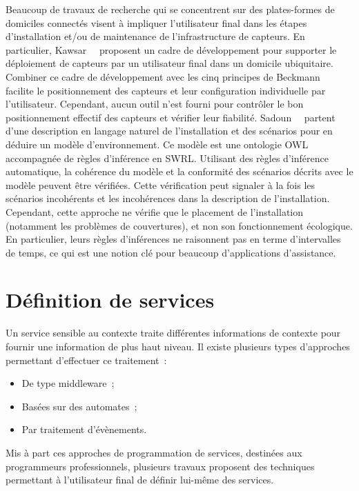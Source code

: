 Beaucoup de travaux de recherche qui se concentrent sur des plates-formes de 
domiciles connectés visent à impliquer l'utilisateur final dans les étapes 
d'installation et/ou de maintenance de l'infrastructure de capteurs.
En particulier, Kawsar~\etal~\parencite{kawsar2088deploy} proposent un cadre de 
développement pour supporter le déploiement de capteurs par un utilisateur final 
dans un domicile ubiquitaire. Combiner ce cadre de développement avec les cinq 
principes de Beckmann~\etal~\parencite{beckmann2004some} facilite le positionnement des 
capteurs et leur configuration individuelle par l'utilisateur. Cependant, aucun 
outil n'est fourni pour contrôler le bon positionnement effectif des capteurs 
et vérifier leur fiabilité.
Sadoun~\etal~\parencite{sadoun2011ontology} partent d'une description en langage naturel de 
l'installation et des scénarios pour en déduire un modèle d'environnement. Ce 
modèle est une ontologie OWL accompagnée de règles d'inférence en SWRL. 
Utilisant des règles d'inférence automatique, la cohérence du modèle et la 
conformité des scénarios décrits avec le modèle peuvent être vérifiées. Cette 
vérification peut signaler à la fois les scénarios incohérents et les 
incohérences dans la description de l'installation. Cependant, cette approche ne 
vérifie que le placement de l'installation (notamment les problèmes de couvertures), 
et non son fonctionnement écologique.
En particulier, leurs règles d'inférences ne raisonnent pas en terme d'intervalles de temps, 
ce qui est une notion clé pour beaucoup d'applications d'assistance.

\section{Définition de services}
Un service sensible au contexte traite différentes informations de contexte pour fournir une information de plus haut niveau. Il existe plusieurs types d'approches permettant d'effectuer ce traitement~:
\begin{itemize}
\item De type middleware~;
\item Basées sur des automates~;
\item Par traitement d'évènements.
\end{itemize}
Mis à part ces approches de programmation de services, destinées aux programmeurs professionnels, plusieurs travaux proposent des techniques permettant à l'utilisateur final de définir lui-même des services.


